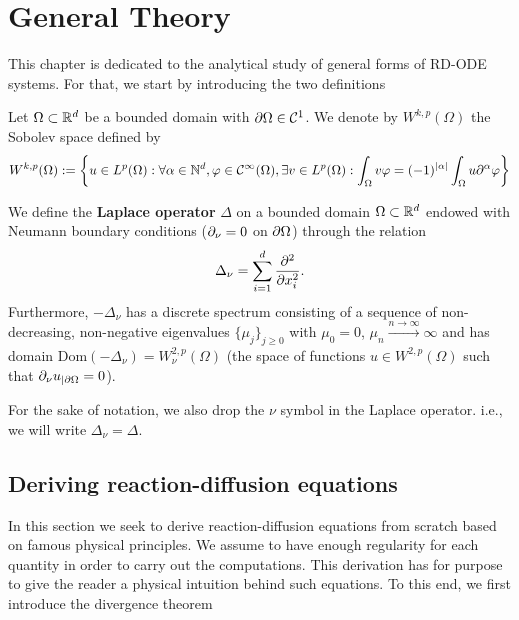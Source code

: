 \section{General Theory}

This chapter is dedicated to the analytical study of general forms of RD-ODE systems. For that, we start by introducing the two definitions

\begin{definition}
	Let $\Omega \subset \mathbb{R}^d$ be a bounded domain with $\partial \Omega \in \mathcal C^1$. We denote by $W^{k, p}(\Omega)$ the Sobolev space defined by
	$$W^{k, p}(\Omega) := \left\{ u \in L^p(\Omega) : \forall \alpha \in \mathbb{N}^d, \varphi \in \mathcal C^\infty(\Omega), \exists v \in L^p(\Omega) : \int_\Omega v \varphi = (-1)^{|\alpha|} \int_\Omega u \partial^\alpha \varphi \right\}$$   
\end{definition}

\begin{definition}
	
	We define the \textbf{Laplace operator}  $\Delta$ on a bounded domain $\Omega \subset \mathbb{R}^d$ endowed with Neumann boundary conditions ($\partial_{\nu} = 0$ on $\partial\Omega$) through the relation
	$$\Delta_\nu = \sum_{i=1}^d \frac{\partial^2}{\partial x_i^2}.$$
	Furthermore, $-\Delta_\nu$ has a discrete spectrum consisting of a sequence of non-decreasing, non-negative eigenvalues 
	$\{\mu_j\}_{j\ge 0}$ with $\mu_0 = 0$, $\mu_n \xrightarrow{n \to \infty} \infty$ and has domain $\mathrm{Dom}(-\Delta_\nu) = W_\nu^{2,p}(\Omega)$ (the space of functions $u\in W^{2,p}(\Omega)$ such that $\partial_\nu u_{\vert \partial\Omega} = 0$).
\end{definition}

For the sake of notation, we also  drop the $\nu$ symbol in the Laplace operator. i.e., we will write $\Delta_\nu = \Delta$. 

\subsection{Deriving reaction-diffusion equations}

In this section we seek to derive reaction-diffusion equations from scratch based on famous physical principles. We assume to have enough regularity for each quantity in order to carry out the computations. This derivation has for purpose to give the reader a physical intuition behind such equations. To this end, we first introduce the divergence theorem

